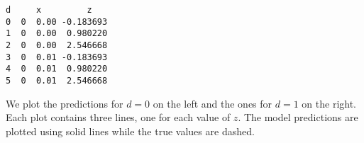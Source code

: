 \documentclass{scrartcl}
\makeatletter
\newcommand{\boxspacing}{\kern\kvtcb@left@rule\kern\kvtcb@boxsep}
\newcommand{\prompt}[4]{
        {\ttfamily\llap{{\color{#2}[#3]:\hspace{3pt}#4}}\vspace{-\baselineskip}}
    }
\makeatother
\begin{document}
            \begin{tcolorbox}[breakable, size=fbox, boxrule=.5pt, pad at break*=1mm, opacityfill=0]
\prompt{Out}{outcolor}{78}{\boxspacing}
\begin{Verbatim}[commandchars=\\\{\}]
   d     x         z
0  0  0.00 -0.183693
1  0  0.00  0.980220
2  0  0.00  2.546668
3  0  0.01 -0.183693
4  0  0.01  0.980220
5  0  0.01  2.546668
\end{Verbatim}
\end{tcolorbox}
        
    We plot the predictions for \(d=0\) on the left and the ones for \(d=1\)
on the right. Each plot contains three lines, one for each value of
\(z\). The model predictions are plotted using solid lines while the
true values are dashed.
\end{document}
